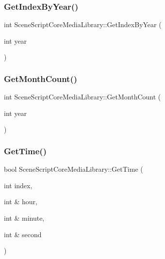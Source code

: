 \hypertarget{class_scene_script_core_media_library_aef3e6ac69fa71d31186775ea53973fa5}{}\label{class_scene_script_core_media_library_aef3e6ac69fa71d31186775ea53973fa5} 
\subsubsection{\texorpdfstring{Get\+Index\+By\+Year()}{GetIndexByYear()}}
{\footnotesize\ttfamily int Scene\+Script\+Core\+Media\+Library\+::\+Get\+Index\+By\+Year (\begin{DoxyParamCaption}\item[{int}]{year }\end{DoxyParamCaption})}

\hypertarget{class_scene_script_core_media_library_aee291d0ed9ab93b83ef8611458931920}{}\label{class_scene_script_core_media_library_aee291d0ed9ab93b83ef8611458931920} 
\subsubsection{\texorpdfstring{Get\+Month\+Count()}{GetMonthCount()}}
{\footnotesize\ttfamily int Scene\+Script\+Core\+Media\+Library\+::\+Get\+Month\+Count (\begin{DoxyParamCaption}\item[{int}]{year }\end{DoxyParamCaption})}

\hypertarget{class_scene_script_core_media_library_a715410e790251617603dd16d35f5d31d}{}\label{class_scene_script_core_media_library_a715410e790251617603dd16d35f5d31d} 
\subsubsection{\texorpdfstring{Get\+Time()}{GetTime()}}
{\footnotesize\ttfamily bool Scene\+Script\+Core\+Media\+Library\+::\+Get\+Time (\begin{DoxyParamCaption}\item[{int}]{index,  }\item[{int \&}]{hour,  }\item[{int \&}]{minute,  }\item[{int \&}]{second }\end{DoxyParamCaption})}

